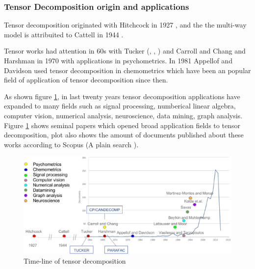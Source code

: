 \documentclass[letterpaper,12pt]{article}
\begin{document}
\subsubsection{Tensor Decomposition origin and applications}


Tensor decomposition originated with Hitchcock in 1927 \cite{Hitchcock1927}, and the the multi-way model is attribuited to Cattell in 1944 \cite{Cattell1944}.

Tensor works had attention in 60s with Tucker (\cite{Tucker1963}, \cite{Tucker1964}, \cite{Tucker1966}) and Carroll and Chang \cite{Carroll1970} and Harshman in 1970 \cite{Harshman1970} with applications in psychometrics. In 1981 Appellof and Davidson \cite{Appellof1981} used tensor decomposition in chemometrics which have been an popular field of application of tensor decomposition since then.

As shown figure \ref{fig:applications}, in last twenty years tensor decomposition applications have expanded to many fields such as signal processing, numberical linear algebra, computer vision, numerical analysis, neuroscience, data mining, graph analysis. Figure \ref{fig:applications} shows seminal papers which opened broad application fields to tensor decomposition, plot also shows the amount of documents published about these works according to Scopus (A plain search ).

\begin{figure}[!ht]
\centering
 \includegraphics[scale=0.5]{Images/time-line.eps}
 \caption{Time-line of tensor decomposition}\label{fig:applications}
\end{figure}

\end{document}

